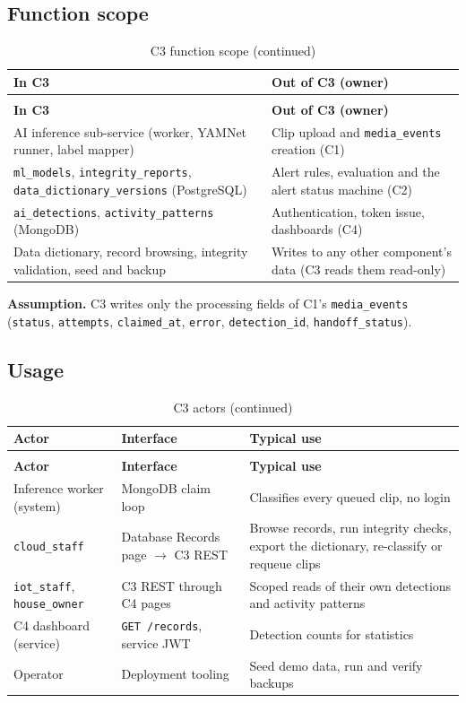 \subsection{Function scope}
\begin{longtable}{L{6.4cm}L{8.4cm}}
\caption{C3 function scope}\label{tab:c3-scope}\\
\toprule
\textbf{In C3} & \textbf{Out of C3 (owner)} \\
\midrule
\endfirsthead
\caption[]{C3 function scope (continued)}\\
\toprule
\textbf{In C3} & \textbf{Out of C3 (owner)} \\
\midrule
\endhead
AI inference sub-service (worker, YAMNet runner, label mapper) & Clip upload and \texttt{media\_events} creation (C1) \\
\texttt{ml\_models}, \texttt{integrity\_reports}, \texttt{data\_dictionary\_versions} (PostgreSQL) & Alert rules, evaluation and the alert status machine (C2) \\
\texttt{ai\_detections}, \texttt{activity\_patterns} (MongoDB) & Authentication, token issue, dashboards (C4) \\
Data dictionary, record browsing, integrity validation, seed and backup & Writes to any other component's data (C3 reads them read-only) \\
\bottomrule
\end{longtable}
\textbf{Assumption.} C3 writes only the processing fields of C1's \texttt{media\_events}
(\texttt{status}, \texttt{attempts}, \texttt{claimed\_at}, \texttt{error}, \texttt{detection\_id}, \texttt{handoff\_status}).

\subsection{Usage}
\begin{longtable}{L{3.0cm}L{4.0cm}L{7.8cm}}
\caption{C3 actors}\label{tab:c3-actors}\\
\toprule
\textbf{Actor} & \textbf{Interface} & \textbf{Typical use} \\
\midrule
\endfirsthead
\caption[]{C3 actors (continued)}\\
\toprule
\textbf{Actor} & \textbf{Interface} & \textbf{Typical use} \\
\midrule
\endhead
Inference worker (system) & MongoDB claim loop & Classifies every queued clip, no login \\
\texttt{cloud\_staff} & Database Records page $\rightarrow$ C3 REST & Browse records, run integrity checks, export the dictionary, re-classify or requeue clips \\
\texttt{iot\_staff}, \texttt{house\_owner} & C3 REST through C4 pages & Scoped reads of their own detections and activity patterns \\
C4 dashboard (service) & \texttt{GET /records}, service JWT & Detection counts for statistics \\
Operator & Deployment tooling & Seed demo data, run and verify backups \\
\bottomrule
\end{longtable}

